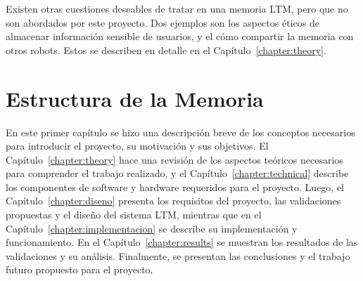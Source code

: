 Existen otras cuestiones deseables de tratar en una memoria LTM, pero que no son abordados por este proyecto. Dos ejemplos son los aspectos éticos de almacenar información sensible de usuarios, y el cómo compartir la memoria con otros robots. Estos se describen en detalle en el Capítulo~\ref{chapter:theory}.


\section{Estructura de la Memoria}

En este primer capítulo se hizo una descripción breve de los conceptos necesarios para introducir el proyecto, su motivación y sus objetivos. El Capítulo~\ref{chapter:theory} hace una revisión de los aspectos teóricos necesarios para comprender el trabajo realizado, y el Capítulo~\ref{chapter:technical} describe los componentes de software y hardware requeridos para el proyecto. Luego, el Capítulo~\ref{chapter:diseno} presenta los requisitos del proyecto, las validaciones propuestas y el diseño del sistema LTM, mientras que en el Capítulo~\ref{chapter:implementacion} se describe su implementación y funcionamiento. En el Capítulo~\ref{chapter:results} se muestran los resultados de las validaciones y su análisis. Finalmente, se presentan las conclusiones y el trabajo futuro propuesto para el proyecto.




